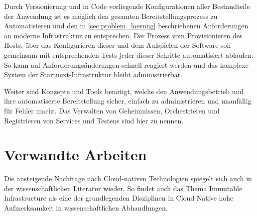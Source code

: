 \documentclass[11pt]{scrartcl}
\begin{document}
Durch Versionierung und in Code vorliegende Konfigurationen aller Bestandteile der Anwendung ist es möglich den gesamten Bereitstellungsprozess zu Automatisieren und den in \cref{sec:problem_loesung} beschriebenen Anforderungen an moderne Infrastruktur zu entsprechen. Der Prozess vom Provisionieren des Hosts, über das Konfigurieren dieser und dem Aufspielen der Software soll gemeinsam mit entsprechenden Tests jeder dieser Schritte automatisiert ablaufen. So kann auf Anforderungsänderungen schnell reagiert
werden und das komplexe System der Startnext-Infrastruktur bleibt administrierbar.

Weiter sind Konzepte und Tools benötigt, welche den Anwendungsbetrieb und ihre automatiserte Bereitstellung
sicher, einfach zu administrieren und unanfällig für Fehler macht. Das Verwalten von Geheimnissen, Orchestrieren und Registrieren von Services und Testens sind hier zu nennen.

\section{Verwandte Arbeiten}

Die ansteigende Nachfrage nach Cloud-nativen Technologien spiegelt sich auch in der wissenschaftlichen Literatur wieder. So findet auch das Thema Immutable Infrastructure als eine der grundlegenden Disziplinen in Cloud Native hohe Aufmerksamkeit in wissenschaftlichen Abhandlungen.
\end{document}
